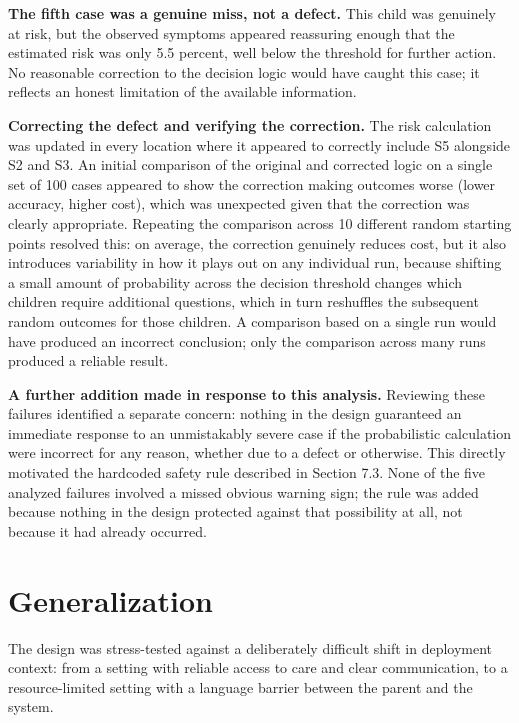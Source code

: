 \documentclass{article}
\begin{document}
\textbf{The fifth case was a genuine miss, not a defect.} This child was
genuinely at risk, but the observed symptoms appeared reassuring enough
that the estimated risk was only 5.5 percent, well below the threshold
for further action. No reasonable correction to the decision logic would
have caught this case; it reflects an honest limitation of the available
information.

\textbf{Correcting the defect and verifying the correction.} The risk
calculation was updated in every location where it appeared to correctly
include S5 alongside S2 and S3. An initial comparison of the original
and corrected logic on a single set of 100 cases appeared to show the
correction making outcomes worse (lower accuracy, higher cost), which
was unexpected given that the correction was clearly appropriate.
Repeating the comparison across 10 different random starting points
resolved this: on average, the correction genuinely reduces cost, but it
also introduces variability in how it plays out on any individual run,
because shifting a small amount of probability across the decision
threshold changes which children require additional questions, which in
turn reshuffles the subsequent random outcomes for those children. A
comparison based on a single run would have produced an incorrect
conclusion; only the comparison across many runs produced a reliable
result.

\textbf{A further addition made in response to this analysis.} Reviewing
these failures identified a separate concern: nothing in the design
guaranteed an immediate response to an unmistakably severe case if the
probabilistic calculation were incorrect for any reason, whether due to
a defect or otherwise. This directly motivated the hardcoded safety rule
described in Section 7.3. None of the five analyzed failures involved a
missed obvious warning sign; the rule was added because nothing in the
design protected against that possibility at all, not because it had
already occurred.

\hypertarget{generalization}{%
\section{Generalization}\label{generalization}}

The design was stress-tested against a deliberately difficult shift in
deployment context: from a setting with reliable access to care and
clear communication, to a resource-limited setting with a language
barrier between the parent and the system.
\end{document}
